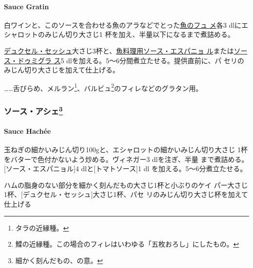 \begin{recette}
\hypertarget{sauce-gratin}{%
\paragraph{Sauce Gratin}\label{sauce-gratin}}

  

白ワインと、このソースを合わせる魚のアラなどでとった\protect\hyperlink{fumet-de-poisson}{魚のフュ
メ}各3 dlにエシャロットのみじん切り大さじ1\undemi{}
杯を加え、半量以下になるまで煮詰める。

\protect\hyperlink{}{デュクセル・セッシュ}大さじ3杯と、\protect\hyperlink{sauce-espagnole-maigre}{魚料理用ソース・エスパニョ
ル}または\protect\hyperlink{sauce-demi-glace}{ソース・ドゥミグラ ス}5
dlを加える。5〜6分間煮立たせる。提供直前に、パ
セリのみじん切り大さじ\undemi{}を加えて仕上げる。

\ldots{}\ldots{}舌びらめ、メルラン\footnote{タラの近縁種。}、バルビュ\footnote{鰈の近縁種。この場合のフィレはいわゆる「五枚おろし」にしたもの。}のフィレなどのグラタン用。

\maeaki

\hypertarget{ux30bdux30fcux30b9ux30a2ux30b7ux30a743}{%
\subsubsection[ソース・アシェ]{\texorpdfstring{ソース・アシェ\footnote{細かく刻んだもの、の意。}}{ソース・アシェ}}\label{ux30bdux30fcux30b9ux30a2ux30b7ux30a743}}

\hypertarget{sauce-hachee}{%
\paragraph{Sauce Hachée}\label{sauce-hachee}}

 

玉ねぎの細かいみじん切り100gと、エシャロットの細かいみじん切り大さじ
1\undemi{}杯をバターで色付かないよう炒める。ヴィネガー3 dlを注ぎ、半量
まで煮詰める。{[}ソース・エスパニョル{]}4
dlと{[}トマトソース{]}1\undemi{} dl を加える。5〜6分煮立たせる。

ハムの脂身のない部分を細かく刻んだもの大さじ1\undemi{}杯と小ぶりのケイ
パー大さじ1\undemi{}杯、{[}デュクセル・セッシュ{]}大さじ1\undemi{}杯、パセ
リのみじん切り大さじ\undemi{}杯を加えて仕上げる


\end{recette}
